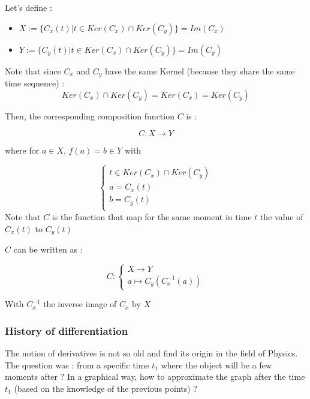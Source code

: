 \documentclass[12pt]{article}
\begin{document}
Let's define :
\begin{itemize}
    \item[] $X := \{{ C_x(t) | t \in Ker(C_x) \cap Ker(C_y) \}} = Im(C_x)$
    \item[] $Y := \{{ C_y(t) | t \in Ker(C_x) \cap Ker(C_y) \}} = Im(C_y)$
\end{itemize}

Note that since $C_x$ and $C_y$ have the same Kernel (because they share the same time sequence) :
$$
Ker(C_x) \cap Ker(C_y) = Ker(C_x) = Ker(C_y)
$$

Then, the corresponding composition function $C$ is :

$$
C: X \rightarrow Y
$$

where for $a \in X$, $f(a)=b \in Y$ with 

$$
\begin{cases}
t \in Ker(C_x) \cap Ker(C_y) \\
a = C_x(t) \\
b = C_y(t) \\
\end{cases}
$$
Note that $C$ is the function that map for the same moment in time $t$ the value of $C_x(t)$ to $C_y(t)$

\bigskip

$C$ can be written as :

$$
C:
\begin{cases}
X \rightarrow Y \\
a \mapsto C_y(C_x^{-1}(a))
\end{cases}
$$

With $C_x^{-1}$ the inverse image of $C_x$ by $X$

\begin{figure}[H]
 \centering
 
\end{figure}

\subsubsection{History of differentiation}

The notion of derivatives is not so old and find its origin in the field of Physics.
The question was : from a specific time $t_1$ where the object will be a few moments after ? In a graphical way, how to approximate the graph after the time $t_1$ (based on the knowledge of the previous points) ?
\end{document}
